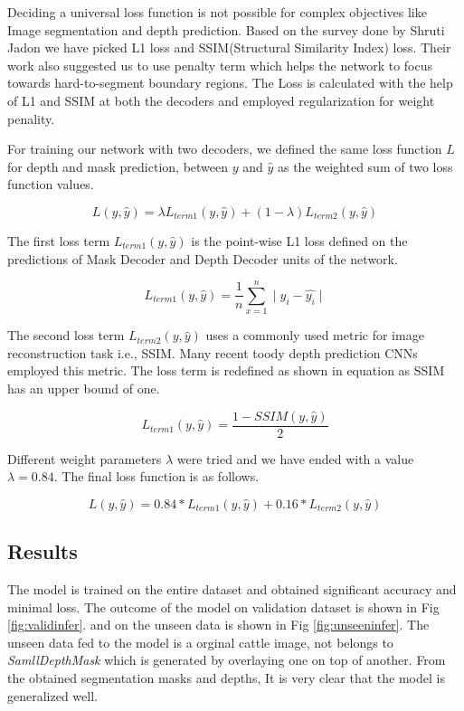 \documentclass[review]{cvpr}
\begin{document}
Deciding a universal loss function is not possible for complex objectives like Image segmentation and depth prediction. Based on the survey done by Shruti Jadon\cite{jadon2020survey} we have picked L1 loss and SSIM(Structural Similarity Index) loss\cite{zhao2015loss}. Their work also suggested us to use penalty term which helps the network to focus towards hard-to-segment boundary regions. The Loss is calculated with the help of L1 and SSIM at both the decoders and employed regularization for weight penality.

For training our network with two decoders, we defined the same loss function $L$ for depth and mask prediction, between $y$ and $\hat{y}$ as the weighted sum of two loss function values.

\begin{equation}
L(y, \hat{y}) = \lambda L_{term1}(y, \hat{y}) + (1 - \lambda) L_{term2}(y, \hat{y})
\end{equation}

The first loss term $L_{term1}(y, \hat{y})$ is the point-wise L1 loss defined on the predictions of Mask Decoder and  
Depth Decoder units of the network.

\begin{equation}
L_{term1}(y, \hat{y}) = \frac{1}{n} \sum_{x=1}^{n} \mid y_i - \hat{y_i} \mid
\end{equation}

The second loss term $L_{term2}(y, \hat{y})$ uses a commonly used metric for image reconstruction task i.e., SSIM. 
Many recent toody depth prediction CNNs employed this metric. 
The loss term is redefined as shown in equation as SSIM has an upper bound of one.

\begin{equation}
L_{term1}(y, \hat{y}) = \frac{1 - SSIM(y, \hat{y})}{2}
\end{equation}

Different weight parameters $\lambda$ were tried and we have ended with a value $\lambda = 0.84$. The final loss function is as follows.

\begin{equation}
L(y, \hat{y}) = 0.84 \ast L_{term1}(y, \hat{y}) + 0.16 \ast L_{term2}(y, \hat{y})
\end{equation}

\subsection{Results}
The model is trained on the entire dataset and obtained significant accuracy and minimal loss. The outcome of the model on validation dataset is shown in Fig \ref{fig:validinfer}. and on the unseen data is shown in Fig \ref{fig:unseeninfer}. The unseen data fed to the model is a orginal cattle image, not belongs to \textit{SamllDepthMask} which is generated by overlaying one on top of another. From the obtained segmentation masks and depths, It is very clear that the model is generalized well.
\end{document}
